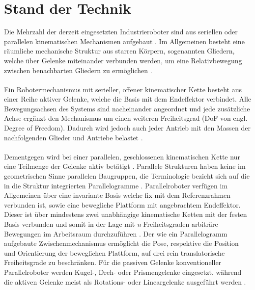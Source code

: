 \documentclass[Bachelor, BMR, ngerman]{twbook}
\begin{document}
\chapter{Stand der Technik}
\label{cap:stand-der-technik}
    
    Die Mehrzahl der derzeit eingesetzten Industrieroboter sind aus seriellen oder parallelen kinematischen Mechanismen aufgebaut \cite{SiKh16}. Im Allgemeinen besteht eine räumliche mechanische Struktur aus starren Körpern, sogenannten Gliedern, welche über Gelenke miteinander verbunden werden, um eine Relativbewegung zwischen benachbarten Gliedern zu ermöglichen \cite{LyPa17}.\\
    \\
    Ein Robotermechanismus mit serieller, offener kinematischer Kette besteht aus einer Reihe aktiver Gelenke, welche die Basis mit dem Endeffektor verbindet. Alle Bewegungsachsen des Systems sind nacheinander angeordnet und jede zusätzliche Achse ergänzt den Mechanismus um einen weiteren Freiheitsgrad (DoF von engl. Degree of Freedom). Dadurch wird jedoch auch jeder Antrieb mit den Massen der nachfolgenden Glieder und Antriebe belastet \cite{Ne06}.\\
    \\
    Dementgegen wird bei einer parallelen, geschlossenen kinematischen Kette nur eine Teilmenge der Gelenke aktiv betätigt \cite{LyPa17}. Parallele Strukturen haben keine im geometrischen Sinne parallelen Baugruppen, die Terminologie bezieht sich auf die in die Struktur integrierten Parallelogramme \cite{Ne06}. Parallelroboter verfügen im Allgemeinen über eine invariante Basis welche fix mit dem Referenzrahmen verbunden ist, sowie eine bewegliche Plattform mit angebrachtem Endeffektor. Dieser ist über mindestens zwei unabhängige kinematische Ketten mit der festen Basis verbunden und somit in der Lage mit \textit{n} Freiheitsgraden arbiträre Bewegungen im Arbeitsraum durchzuführen \cite{SiKh16,StCa03}. Der wie ein Parallelogramm aufgebaute Zwischenmechanismus ermöglicht die Pose, respektive die Position und Orientierung der beweglichen Plattform, auf drei rein translatorische Freiheitsgrade zu beschränken. Für die passiven Gelenke konventioneller Parallelroboter werden Kugel-, Dreh- oder Prismengelenke eingesetzt, während die aktiven Gelenke meist als Rotations- oder Lineargelenke ausgeführt werden \cite{StCa03}.\\
\end{document}
